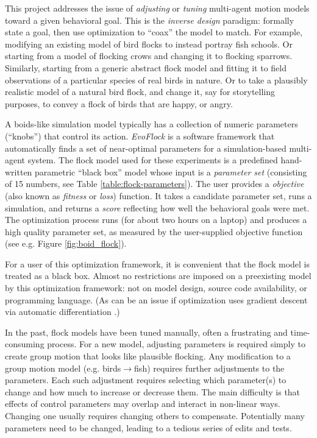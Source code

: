 \documentclass[letterpaper]{article}
\begin{document}
This project addresses the issue of \textit{adjusting} or \textit{tuning} multi-agent motion models toward a given behavioral goal. This is the \textit{inverse design} paradigm: formally state a goal, then use optimization to ``coax'' the model to match. For example, modifying an existing model of bird flocks to instead portray fish schools. Or starting from a model of flocking crows and changing it to flocking sparrows. Similarly, starting from a generic abstract flock model and fitting it to field observations of a particular species of real birds in nature. Or to take a plausibly realistic model of a natural bird flock, and change it, say for storytelling purposes, to convey a flock of birds that are happy, or angry. 

A boids-like simulation model typically has a collection of numeric parameters (``knobs'') that control its action. \textit{EvoFlock} is a software framework that automatically finds a set of near-optimal parameters for a simulation-based multi-agent system. The flock model used for these experiments is a predefined hand-written parametric ``black box'' model whose input is a \textit{parameter set} (consisting of 15 numbers, see Table \ref{table:flock-parameters}). The user provides a \textit{objective} (also known as \textit{fitness} or \textit{loss}) function. It takes a candidate parameter set, runs a simulation, and returns a \textit{score} reflecting how well the behavioral goals were met. The optimization process runs (for about two hours on a laptop) and produces a high quality parameter set, as measured by the user-supplied objective function (see e.g. Figure \ref{fig:boid_flock}).

For a user of this optimization framework, it is convenient that the flock model is treated as a black box. Almost no restrictions are imposed on a preexisting model by this optimization framework: not on model design, source code availability, or programming language. (As can be an issue if optimization uses gradient descent via automatic differentiation \citep{baydin_automatic_2018}.)

In the past, flock models have been tuned manually, often a frustrating and time-consuming process. For a new model, adjusting parameters is required simply to create group motion that looks like plausible flocking. Any modification to a group motion model (e.g. birds{$\rightarrow$}fish) requires further adjustments to the parameters. Each such adjustment requires selecting which parameter(s) to change and how much to increase or decrease them. The main difficulty is that effects of control parameters may overlap and interact in non-linear ways. Changing one usually requires changing others to compensate. Potentially many parameters need to be changed, leading to a tedious series of edits and tests.
\end{document}
